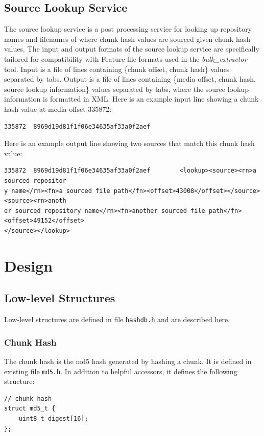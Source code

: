 \documentclass[12pt,twoside]{article}
\newcommand{\bulk}{\emph{bulk\_extractor}\xspace}
\begin{document}
\subsection{Source Lookup Service}
The source lookup service is a post processing service
for looking up repository names and filenames of where chunk hash values are sourced
given chunk hash values.
The input and output formats of the source lookup service are specifically tailored
for compatibility with Feature file formats used in the \bulk tool.
Input is a file of lines containing \{chunk offset, chunk hash\} values separated by tabs.
Output is a file of lines containing \{media offset, chunk hash,
source lookup information\} values
separated by tabs, where the source lookup information is formatted in XML.
Here is an example input line showing a chunk hash value at media offset 335872:
\begin{small}
\begin{verbatim}
335872  8969d19d81f1f06e34635af33a0f2aef
\end{verbatim}
\end{small}
Here is an example output line showing two sources that match this chunk hash value:
\begin{small}
\begin{verbatim}
335872  8969d19d81f1f06e34635af33a0f2aef        <lookup><source><rn>a sourced repositor
y name</rn><fn>a sourced file path</fn><offset>43008</offset></source><source><rn>anoth
er sourced repository name</rn><fn>another sourced file path</fn><offset>49152</offset>
</source></lookup>
\end{verbatim}
\end{small}

\section{Design}
\subsection{Low-level Structures}
Low-level structures are defined in file \texttt{hashdb.h}
and are described here.
\subsubsection{Chunk Hash}
The chunk hash is the md5 hash generated by hashing a chunk.
It is defined in existing file \texttt{md5.h}.
In addition to helpful accessors, it defines the following structure:
\begin{small}
\begin{verbatim}
// chunk hash
struct md5_t {
    uint8_t digest[16];
};
\end{verbatim}
\end{small}
\end{document}
